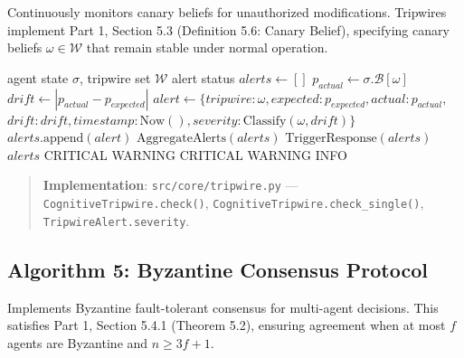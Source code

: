 \documentclass[
]{article}
\begin{document}
Continuously monitors canary beliefs for unauthorized modifications.
Tripwires implement Part 1, Section 5.3 (Definition 5.6: Canary Belief),
specifying canary beliefs \(\omega \in \mathcal{W}\) that remain stable
under normal operation.

\begin{algorithm}
\caption{Tripwire Monitoring}
\label{alg:tripwire-impl}
\begin{algorithmic}[1]
\Require agent state $\sigma$, tripwire set $\mathcal{W}$
\Ensure alert status
  \State $alerts \gets []$
    \State $p_{actual} \gets \sigma.\mathcal{B}[\omega]$
    \State $drift \gets |p_{actual} - p_{expected}|$
      \State $alert \gets \{tripwire: \omega, expected: p_{expected}, actual: p_{actual},$
      \State \quad\quad\quad\quad $drift: drift, timestamp: \text{Now}(), severity: \text{Classify}(\omega, drift)\}$
      \State $alerts.\text{append}(alert)$
    \EndIf
  \EndFor
    \State $\text{AggregateAlerts}(alerts)$
    \State $\text{TriggerResponse}(alerts)$
  \EndIf
  \Return $alerts$
\EndFunction
{}
      \Return CRITICAL
      \Return WARNING
    \EndIf
  \Else
      \Return CRITICAL
      \Return WARNING
    \EndIf
  \EndIf
  \Return INFO
\EndFunction
\end{algorithmic}
\end{algorithm}

\begin{quote}
\textbf{Implementation}: \texttt{src/core/tripwire.py} ---
\texttt{CognitiveTripwire.check()},
\texttt{CognitiveTripwire.check\_single()},
\texttt{TripwireAlert.severity}.
\end{quote}

\subsection{Algorithm 5: Byzantine Consensus
Protocol}\label{sec:alg-byzantine}

Implements Byzantine fault-tolerant consensus for multi-agent decisions.
This satisfies Part 1, Section 5.4.1 (Theorem 5.2), ensuring agreement
when at most \(f\) agents are Byzantine and \(n \geq 3f + 1\).
\end{document}
